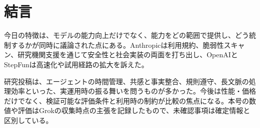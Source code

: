 \section*{結言}
今日の特徴は、モデルの能力向上だけでなく、能力をどの範囲で提供し、どう統制するかが同時に議論された点にある。Anthropicは利用規約、脆弱性スキャン、研究機関支援を通じて安全性と社会実装の両面を打ち出し、OpenAIとStepFunは高速化や試用経路の拡大を訴えた。

研究投稿は、エージェントの時間管理、共感と事実整合、規則遵守、長文脈の処理効率といった、実運用時の振る舞いを問うものが多かった。今後は性能・価格だけでなく、検証可能な評価条件と利用時の制約が比較の焦点になる。本号の数値や評価はGrokの収集時点の主張を記録したもので、未確認事項は確定情報と区別している。
